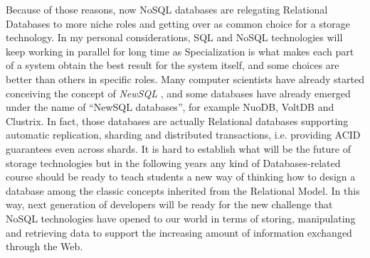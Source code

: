 Because of those reasons, now NoSQL databases are relegating Relational Databases to more niche roles and getting over as common choice for a storage technology.
In my personal considerations, SQL and NoSQL technologies will keep working in parallel for long time as Specialization is what makes each part of a system obtain the best result for the system itself, and some choices are better than others in specific roles.
Many computer scientists have already started conceiving the concept of \textit{NewSQL} \cite{corbellini}, and some databases have already emerged under the name of “NewSQL databases”, for example NuoDB, VoltDB and Clustrix.
In fact, those databases are actually Relational databases supporting automatic replication, sharding and distributed transactions, i.e. providing ACID guarantees even across shards. 
It is hard to establish what will be the future of storage technologies but in the following years any kind of Databases-related course should be ready to teach students a new way of thinking how to design a database among the classic concepts inherited from the Relational Model.
In this way, next generation of developers will be ready for the new challenge  that NoSQL technologies have opened to our world in terms of storing, manipulating and retrieving data to support the increasing amount of information exchanged through the Web.

